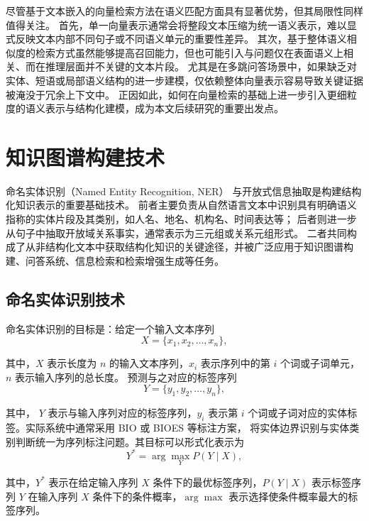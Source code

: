 尽管基于文本嵌入的向量检索方法在语义匹配方面具有显著优势，但其局限性同样值得关注。
首先，单一向量表示通常会将整段文本压缩为统一语义表示，难以显式反映文本内部不同句子或不同语义单元的重要性差异。
其次，基于整体语义相似度的检索方式虽然能够提高召回能力，但也可能引入与问题仅在表面语义上相关、而在推理层面并不关键的文本片段。
尤其是在多跳问答场景中，如果缺乏对实体、短语或局部语义结构的进一步建模，仅依赖整体向量表示容易导致关键证据被淹没于冗余上下文中。
正因如此，如何在向量检索的基础上进一步引入更细粒度的语义表示与结构化建模，成为本文后续研究的重要出发点。

\section{知识图谱构建技术}

命名实体识别（Named Entity Recognition, NER）
与开放式信息抽取是构建结构化知识表示的重要基础技术。
前者主要负责从自然语言文本中识别具有明确语义指称的实体片段及其类别，如人名、地名、机构名、时间表达等；
后者则进一步从句子中抽取开放域关系事实，通常表示为三元组或关系元组形式。
二者共同构成了从非结构化文本中获取结构化知识的关键途径，并被广泛应用于知识图谱构建、问答系统、信息检索和检索增强生成等任务。

\subsection{命名实体识别技术}

命名实体识别的目标是：给定一个输入文本序列
\begin{equation}
X = \{x_1, x_2, \dots, x_n\},
\end{equation}

\noindent 其中，$X$ 表示长度为 $n$ 的输入文本序列，$x_i$ 表示序列中的第 $i$ 个词或子词单元，$n$ 表示输入序列的总长度。
预测与之对应的标签序列
\begin{equation}
Y = \{y_1, y_2, \dots, y_n\},
\end{equation}

\noindent 其中， $Y$ 表示与输入序列对应的标签序列，$y_i$ 表示第 $i$ 个词或子词对应的实体标签。实际系统中通常采用 BIO 或 BIOES 等标注方案，
将实体边界识别与实体类别判断统一为序列标注问题。其目标可以形式化表示为
\begin{equation}
Y^{*} = \arg\max_{Y} P(Y \mid X),
\end{equation}

\noindent 其中，$Y^{*}$ 表示在给定输入序列 $X$ 条件下的最优标签序列，$P(Y \mid X)$ 表示标签序列 $Y$ 在输入序列 $X$ 条件下的条件概率，$\arg\max$ 表示选择使条件概率最大的标签序列。


